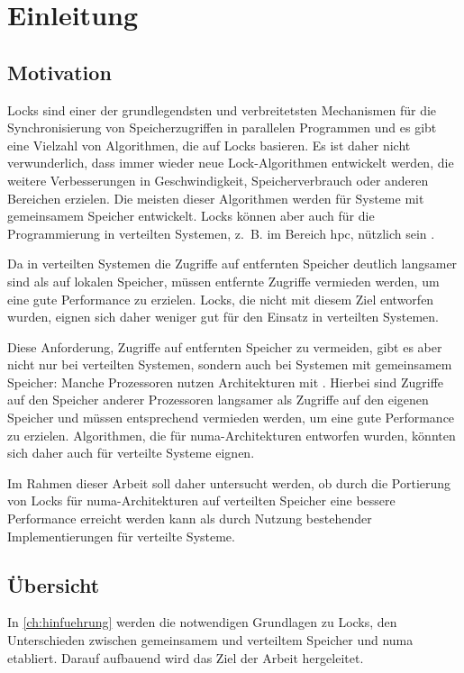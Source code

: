 \chapter{Einleitung}

\section{Motivation}

Locks sind einer der grundlegendsten und verbreitetsten Mechanismen für die Synchronisierung von Speicherzugriffen in parallelen Programmen
und es gibt eine Vielzahl von Algorithmen,
die auf Locks basieren.
Es ist daher nicht verwunderlich,
dass immer wieder neue Lock-Algorithmen entwickelt werden,
die weitere Verbesserungen in Geschwindigkeit, Speicherverbrauch oder anderen Bereichen erzielen.
Die meisten dieser Algorithmen werden für Systeme mit gemeinsamem Speicher entwickelt.
Locks können aber auch für die Programmierung in verteilten Systemen,
z.~B. im Bereich \gls{hpc},
nützlich sein \cite{RMA-RW}.

Da in verteilten Systemen die Zugriffe auf entfernten Speicher deutlich langsamer sind
als auf lokalen Speicher,
müssen entfernte Zugriffe vermieden werden,
um eine gute Performance zu erzielen.
Locks, die nicht mit diesem Ziel entworfen wurden,
eignen sich daher weniger gut für den Einsatz in verteilten Systemen.

Diese Anforderung,
Zugriffe auf entfernten Speicher zu vermeiden,
gibt es aber nicht nur bei verteilten Systemen,
sondern auch bei Systemen mit gemeinsamem Speicher:
Manche Prozessoren nutzen Architekturen mit .
Hierbei sind Zugriffe auf den Speicher anderer Prozessoren langsamer
als Zugriffe auf den eigenen Speicher \cite{NUMA}
und müssen entsprechend vermieden werden,
um eine gute Performance zu erzielen.
Algorithmen,
die für \gls{numa}-Architekturen entworfen wurden,
könnten sich daher auch für verteilte Systeme eignen.

Im Rahmen dieser Arbeit soll daher untersucht werden,
ob durch die Portierung von Locks für \gls{numa}-Architekturen auf verteilten Speicher
eine bessere Performance erreicht werden kann
als durch Nutzung bestehender Implementierungen für verteilte Systeme.

\section{Übersicht}

In \autoref{ch:hinfuehrung} werden die notwendigen Grundlagen zu Locks,
den Unterschieden zwischen gemeinsamem und verteiltem Speicher
und \gls{numa} etabliert.
Darauf aufbauend wird das Ziel der Arbeit hergeleitet.

